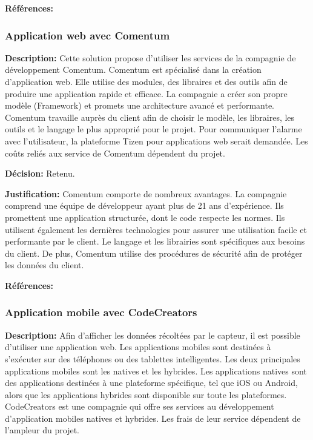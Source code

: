 \textbf{Références:} \cite{PF} \cite{PF_Roma} \cite{PF_exemple} \cite{Dev_salary} \cite{Chrome_Alarm}

\subsubsection{Application web avec Comentum}

\textbf{Description:} Cette solution propose d'utiliser les services de la compagnie de développement Comentum. Comentum est spécialisé dans la création d'application web. Elle utilise des modules, des libraires et des outils afin de produire une application rapide et efficace. La compagnie a créer son propre modèle (Framework) et promets une architecture avancé et performante. Comentum travaille auprès du client afin de choisir le modèle, les libraires, les outils et le langage le plus approprié pour le projet. Pour communiquer l'alarme avec l'utilisateur, la plateforme Tizen pour applications web serait demandée. Les coûts reliés aux service de Comentum dépendent du projet.

\textbf{Décision:} Retenu.

\textbf{Justification:} Comentum comporte de nombreux avantages. La compagnie comprend une équipe de développeur ayant plus de 21 ans d'expérience. Ils promettent une application structurée, dont le code respecte les normes. Ils utilisent également les dernières technologies pour assurer une utilisation facile et performante par le client. Le langage et les librairies sont spécifiques aux besoins du client. De plus, Comentum utilise des procédures de sécurité afin de protéger les données du client.

\textbf{Références:} \cite{Comentum} \cite{Tizen}

\subsubsection{Application mobile avec CodeCreators}

\textbf{Description:} Afin d'afficher les données récoltées par le capteur, il est possible d'utiliser une application web. Les applications mobiles sont destinées à s'exécuter sur des téléphones ou des tablettes intelligentes. Les deux principales applications mobiles sont les natives et les hybrides. Les applications natives sont des applications destinées à une plateforme spécifique, tel que iOS ou Android, alors que les applications hybrides sont disponible sur toute les plateformes. CodeCreators est une compagnie qui offre ses services au développement d'application mobiles natives et hybrides. Les frais de leur service dépendent de l'ampleur du projet.


